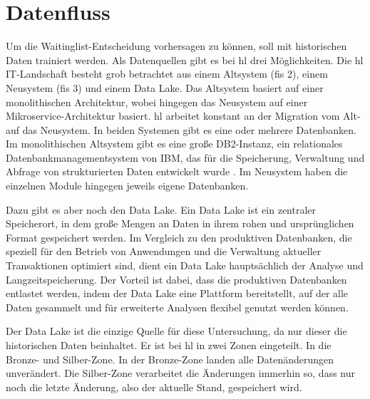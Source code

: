 
\section{Datenfluss}
\label{sec:datenfluss}

Um die Waitinglist-Entscheidung vorhersagen zu können, soll mit historischen Daten trainiert werden. Als Datenquellen gibt es bei \gls{hl} drei Möglichkeiten. Die \gls{hl} IT-Landschaft besteht grob betrachtet aus einem Altsystem (\gls{fis} 2), einem Neusystem (\gls{fis} 3) und einem Data Lake. Das Altsystem basiert auf einer monolithischen Architektur, wobei hingegen das Neusystem auf einer Mikroservice-Architektur basiert. 
\gls{hl} arbeitet konstant an der Migration vom Alt- auf das Neusystem. 
In beiden Systemen gibt es eine oder mehrere Datenbanken. 
Im monolithischen Altsystem gibt es eine große \label{ref:DB2}DB2-Instanz, ein relationales Datenbankmanagementsystem von IBM, das für die Speicherung, Verwaltung und Abfrage von strukturierten Daten entwickelt wurde \cite{IBMDb2}.   
Im Neusystem haben die einzelnen Module hingegen jeweils eigene Datenbanken.
        
Dazu gibt es aber noch den Data Lake. Ein Data Lake ist ein zentraler Speicherort, in dem große Mengen an Daten in ihrem rohen und ursprünglichen Format gespeichert werden. Im Vergleich zu den produktiven Datenbanken, die speziell für den Betrieb von Anwendungen und die Verwaltung aktueller Transaktionen optimiert sind, dient ein Data Lake hauptsächlich der Analyse und Langzeitspeicherung. Der Vorteil ist dabei, dass die produktiven Datenbanken entlastet werden, indem der Data Lake eine Plattform bereitstellt, auf der alle Daten gesammelt und für erweiterte Analysen flexibel genutzt werden können.

Der Data Lake ist die einzige Quelle für diese Untersuchung, da nur dieser die historischen Daten beinhaltet.
Er ist bei \gls{hl} in zwei Zonen eingeteilt. In die Bronze- und Silber-Zone. In der Bronze-Zone landen alle Datenänderungen unverändert. Die Silber-Zone verarbeitet die Änderungen immerhin so, dass nur noch die letzte Änderung, also der aktuelle Stand, gespeichert wird. 

